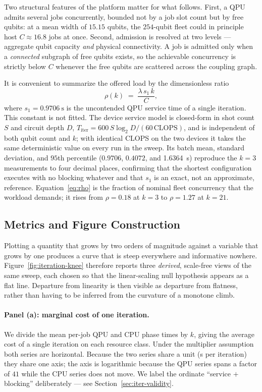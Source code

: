 Two structural features of the platform matter for what follows. First, a QPU
admits several jobs concurrently, bounded not by a job slot count but by free
qubits: at a mean width of $15.15$ qubits, the $254$-qubit fleet could in
principle host $C \approx 16.8$ jobs at once. Second, admission is resolved at
two levels --- aggregate qubit capacity \emph{and} physical connectivity. A job
is admitted only when a \emph{connected} subgraph of free qubits exists, so the
achievable concurrency is strictly below $C$ whenever the free qubits are
scattered across the coupling graph.

It is convenient to summarize the offered load by the dimensionless ratio
\begin{equation}
  \rho(k) \;=\; \frac{\lambda \, s_1 \, k}{C},
  \label{eq:rho}
\end{equation}
where $s_1 = \qty{0.9706}{\second}$ is the uncontended QPU service time of a
single iteration. This constant is not fitted. The device service model is
closed-form in shot count $S$ and circuit depth $D$,
$T_{\mathrm{iter}} = 600\,S\log_2 D / (60\,\mathrm{CLOPS})$, and is independent
of both qubit count and $k$; with identical CLOPS on the two devices it takes
the same deterministic value on every run in the sweep. Its batch mean,
standard deviation, and $95$th percentile ($0.9706$, $0.4072$, and
\qty{1.6364}{\second}) reproduce the $k=3$ measurements to four decimal places,
confirming that the shortest configuration executes with no blocking whatever
and that $s_1$ is an exact, not an approximate, reference.
Equation~\eqref{eq:rho}
is the fraction of nominal fleet concurrency that the workload demands; it rises
from $\rho = 0.18$ at $k=3$ to $\rho = 1.27$ at $k=21$.

\subsection{Metrics and Figure Construction}
\label{sec:iter-metrics}

Plotting a quantity that grows by two orders of magnitude against a variable
that grows by one produces a curve that is steep everywhere and informative
nowhere. Figure~\ref{fig:iteration-knee} therefore reports three
\emph{derived}, scale-free views of the same sweep, each chosen so that the
linear-scaling null hypothesis appears as a flat line. Departure from linearity
is then visible as departure from flatness, rather than having to be inferred
from the curvature of a monotone climb.

\paragraph{Panel (a): marginal cost of one iteration.}
We divide the mean per-job QPU and CPU phase times by $k$, giving the average
cost of a single iteration on each resource class. Under the multiplier
assumption both series are horizontal. Because the two series share a unit
(\unit{\second} per iteration) they share one axis; the axis is logarithmic
because the QPU series spans a factor of $41$ while the CPU series does not
move. We label the ordinate ``service $+$ blocking'' deliberately --- see
Section~\ref{sec:iter-validity}.

